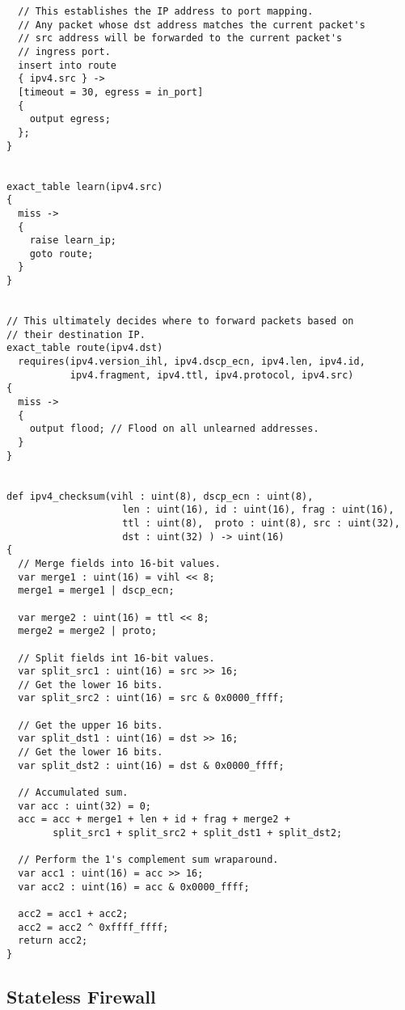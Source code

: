 \begin{lstlisting}
  // This establishes the IP address to port mapping.
  // Any packet whose dst address matches the current packet's
  // src address will be forwarded to the current packet's
  // ingress port.
  insert into route
  { ipv4.src } ->
  [timeout = 30, egress = in_port]
  {
    output egress;
  };
}


exact_table learn(ipv4.src)
{
  miss ->
  {
    raise learn_ip;
    goto route;
  }
}


// This ultimately decides where to forward packets based on
// their destination IP.
exact_table route(ipv4.dst)
  requires(ipv4.version_ihl, ipv4.dscp_ecn, ipv4.len, ipv4.id,
           ipv4.fragment, ipv4.ttl, ipv4.protocol, ipv4.src)
{
  miss ->
  {
    output flood; // Flood on all unlearned addresses.
  }
}


def ipv4_checksum(vihl : uint(8), dscp_ecn : uint(8), 
					len : uint(16),	id : uint(16), frag : uint(16), 
					ttl : uint(8),  proto : uint(8), src : uint(32), 
					dst : uint(32) ) -> uint(16)
{
  // Merge fields into 16-bit values.
  var merge1 : uint(16) = vihl << 8;
  merge1 = merge1 | dscp_ecn;

  var merge2 : uint(16) = ttl << 8;
  merge2 = merge2 | proto;

  // Split fields int 16-bit values.
  var split_src1 : uint(16) = src >> 16;
  // Get the lower 16 bits.
  var split_src2 : uint(16) = src & 0x0000_ffff;

  // Get the upper 16 bits.
  var split_dst1 : uint(16) = dst >> 16;
  // Get the lower 16 bits.
  var split_dst2 : uint(16) = dst & 0x0000_ffff;

  // Accumulated sum.
  var acc : uint(32) = 0;
  acc = acc + merge1 + len + id + frag + merge2 +
        split_src1 + split_src2 + split_dst1 + split_dst2;

  // Perform the 1's complement sum wraparound.
  var acc1 : uint(16) = acc >> 16;
  var acc2 : uint(16) = acc & 0x0000_ffff;

  acc2 = acc1 + acc2;
  acc2 = acc2 ^ 0xffff_ffff;
  return acc2;
}
\end{lstlisting}

\subsection{Stateless Firewall}


